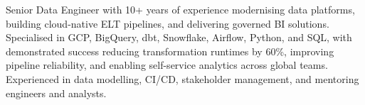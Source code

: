 

\begin{cvparagraph}

Senior Data Engineer with 10+ years of experience modernising data platforms, building cloud-native ELT pipelines, and delivering governed BI solutions. Specialised in GCP, BigQuery, dbt, Snowflake, Airflow, Python, and SQL, with demonstrated success reducing transformation runtimes by 60\%, improving pipeline reliability, and enabling self-service analytics across global teams. Experienced in data modelling, CI/CD, stakeholder management, and mentoring engineers and analysts.
\end{cvparagraph}
